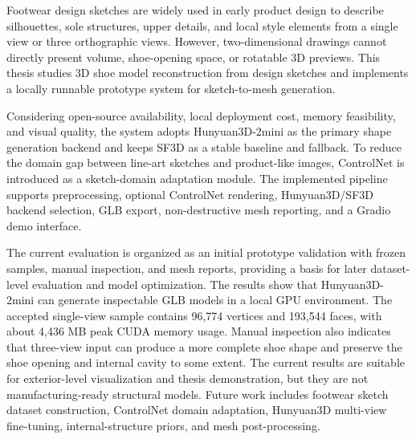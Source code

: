 \begin{abstract*}
  Footwear design sketches are widely used in early product design to describe silhouettes, sole structures, upper details, and local style elements from a single view or three orthographic views. However, two-dimensional drawings cannot directly present volume, shoe-opening space, or rotatable 3D previews. This thesis studies 3D shoe model reconstruction from design sketches and implements a locally runnable prototype system for sketch-to-mesh generation.

  Considering open-source availability, local deployment cost, memory feasibility, and visual quality, the system adopts Hunyuan3D-2mini as the primary shape generation backend and keeps SF3D as a stable baseline and fallback. To reduce the domain gap between line-art sketches and product-like images, ControlNet is introduced as a sketch-domain adaptation module. The implemented pipeline supports preprocessing, optional ControlNet rendering, Hunyuan3D/SF3D backend selection, GLB export, non-destructive mesh reporting, and a Gradio demo interface.

  The current evaluation is organized as an initial prototype validation with frozen samples, manual inspection, and mesh reports, providing a basis for later dataset-level evaluation and model optimization. The results show that Hunyuan3D-2mini can generate inspectable GLB models in a local GPU environment. The accepted single-view sample contains 96,774 vertices and 193,544 faces, with about 4,436 MB peak CUDA memory usage. Manual inspection also indicates that three-view input can produce a more complete shoe shape and preserve the shoe opening and internal cavity to some extent. The current results are suitable for exterior-level visualization and thesis demonstration, but they are not manufacturing-ready structural models. Future work includes footwear sketch dataset construction, ControlNet domain adaptation, Hunyuan3D multi-view fine-tuning, internal-structure priors, and mesh post-processing.
\end{abstract*}
